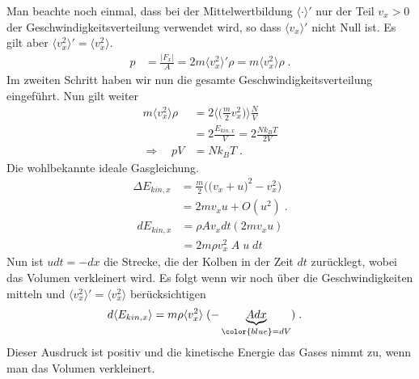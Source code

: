 Man beachte noch einmal, dass bei der Mittelwertbildung $\langle \cdot \rangle'$ nur der Teil $v_{x}>0$ der Geschwindigkeitsverteilung verwendet wird, so dass $\langle v_{x}\rangle' $ nicht Null ist. Es gilt aber 
$\langle v_{x}^{2}\rangle'=\langle v_{x}^{2}\rangle$.
\begin{align}\label{eq:heat:druck}
p &= \frac{|F_{x}|}{A}=
  2 m \langle v_{x}^{2}\rangle'  \rho 
=     m \langle v_{x}^{2}\rangle  \rho \;.
\end{align}
Im zweiten Schritt haben wir nun die gesamte Geschwindigkeitsverteilung eingeführt.
Nun gilt weiter
\begin{align*}
     m \langle v_{x}^{2}\rangle  \rho &=
     2  \langle \big(\frac{m}{2}v_{x}^{2}\big)\rangle  \frac{N}{V} \\
     &=     2 \frac{E_{kin,x}}{V}
     =2 \frac{N k_{B} T}{2V }\\
     \Rightarrow\quad p V &= N k_{B} T\;.
\end{align*}
 Die wohlbekannte ideale Gasgleichung.
 \begin{align*}
\Delta E_{kin,x} &= \frac{m}{2}\bigg(
\big(v_{x} + u\big)^{2}
- v_{x}^{2} 
\bigg)\\
&= 2 m v_{x} u + O(u^{2})\;.
\end{align*}
\begin{align*}
d  E_{kin,x} &= \rho A v_{x} dt (2 m v_{x} u)\\
&= 2 m \rho v_{x}^{2} \;A\;u\;dt
\end{align*}
Nun ist $u dt = -dx$ die Strecke, die der Kolben in der Zeit $dt$ zurücklegt, wobei das Volumen verkleinert wird. Es folgt wenn wir noch über die Geschwindigkeiten mitteln und 
$\langle v_{x}^{2}\rangle'=\langle v_{x}^{2}\rangle$ berücksichtigen
\begin{align*}
d  \langle E_{kin,x}\rangle 
&= m \rho \langle v_{x}^{2}\rangle \;(-\underbrace{
A dx
}_{\color{blue} = dV})\;.
\end{align*}
Dieser Ausdruck ist positiv und die kinetische Energie das Gases nimmt zu, wenn man das Volumen verkleinert.
